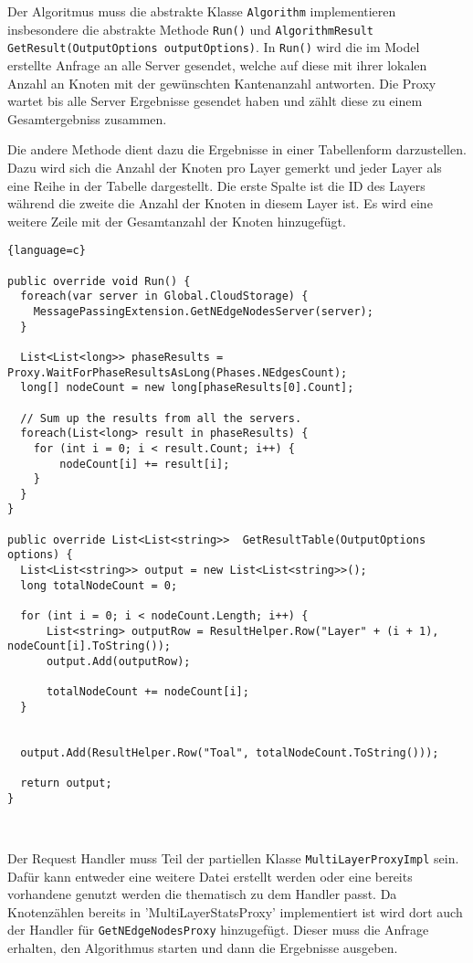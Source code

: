 Der Algoritmus muss die abstrakte Klasse \verb|Algorithm| implementieren insbesondere die abstrakte Methode \verb|Run()| und \verb|AlgorithmResult GetResult(OutputOptions outputOptions)|. In \verb|Run()| wird die im Model erstellte Anfrage an alle Server gesendet, welche auf diese mit ihrer lokalen Anzahl an Knoten mit der gewünschten Kantenanzahl antworten. Die Proxy
wartet bis alle Server Ergebnisse gesendet haben und zählt diese zu einem Gesamtergebniss zusammen.

Die andere Methode dient dazu die Ergebnisse in einer Tabellenform darzustellen. Dazu wird sich die Anzahl der Knoten pro Layer gemerkt und jeder Layer als eine Reihe in der Tabelle dargestellt. Die erste Spalte ist die ID des Layers während die zweite die Anzahl der Knoten in diesem Layer ist. Es wird eine weitere Zeile mit der Gesamtanzahl der Knoten hinzugefügt.

\begin{lstlisting}{language=c}

public override void Run() {
  foreach(var server in Global.CloudStorage) {
    MessagePassingExtension.GetNEdgeNodesServer(server);
  }

  List<List<long>> phaseResults =  Proxy.WaitForPhaseResultsAsLong(Phases.NEdgesCount);
  long[] nodeCount = new long[phaseResults[0].Count];

  // Sum up the results from all the servers.
  foreach(List<long> result in phaseResults) {
    for (int i = 0; i < result.Count; i++) {
        nodeCount[i] += result[i];
    }
  }
}

public override List<List<string>>  GetResultTable(OutputOptions options) {
  List<List<string>> output = new List<List<string>>();
  long totalNodeCount = 0;

  for (int i = 0; i < nodeCount.Length; i++) {
      List<string> outputRow = ResultHelper.Row("Layer" + (i + 1), nodeCount[i].ToString()); 
      output.Add(outputRow);

      totalNodeCount += nodeCount[i];
  }


  output.Add(ResultHelper.Row("Toal", totalNodeCount.ToString()));

  return output;
}



\end{lstlisting}


Der Request Handler muss Teil der partiellen Klasse \verb|MultiLayerProxyImpl| sein. Dafür kann entweder eine weitere Datei erstellt werden oder eine bereits vorhandene genutzt werden die thematisch zu dem Handler passt.
Da Knotenzählen bereits in 'MultiLayerStatsProxy' implementiert ist wird dort auch der Handler für \verb|GetNEdgeNodesProxy| hinzugefügt. Dieser muss die Anfrage erhalten, den Algorithmus starten und dann die Ergebnisse ausgeben.

